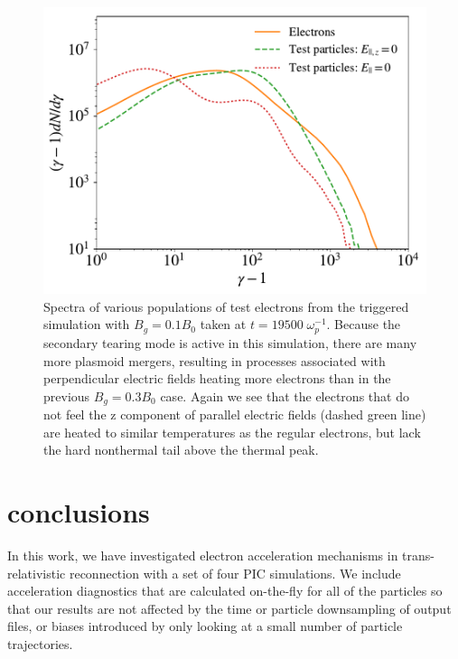 \begin{figure}[htp] 
	\includegraphics[width=\linewidth]{final_testprtl_bguide1_triggered065.pdf}
	\caption{Spectra of various populations of test electrons from the triggered simulation with $B_{g}=0.1B_{0}$ taken at $t=19500 \; \omega_{p}^{-1}$.  Because the secondary tearing mode is active in this simulation, there are many more plasmoid mergers, resulting in processes associated with perpendicular electric fields heating more electrons than in the previous $B_{g}=0.3B_{0}$ case.  Again we see that the electrons that do not feel the z component of parallel electric fields (dashed green line) are heated to similar temperatures as the regular electrons, but lack the hard nonthermal tail above the thermal peak.  }

	\label{bguide1_testprtl_spec}
\end{figure}




\section{conclusions}
In this work, we have investigated electron acceleration mechanisms in trans-relativistic reconnection with a set of four PIC simulations.  We include acceleration diagnostics that are calculated on-the-fly for all of the particles so that our results are not affected by the time or particle downsampling of output files, or biases introduced by only looking at a small number of particle trajectories.

